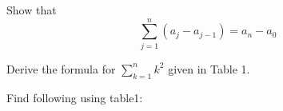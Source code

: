 \documentclass{exam}
\begin{document}
\begin{questions}

\question Show that \[
\sum_{j=1}^{n} (a_j - a_{j-1}) = a_n - a_0
\]
\vspace{9in}

\question Derive the formula for $\displaystyle \sum_{k=1}^{n} k^2$ given in Table 1.
\vspace{9in}


\question Find following using table1:
\vspace{9in}
\end{questions}
\end{document}
